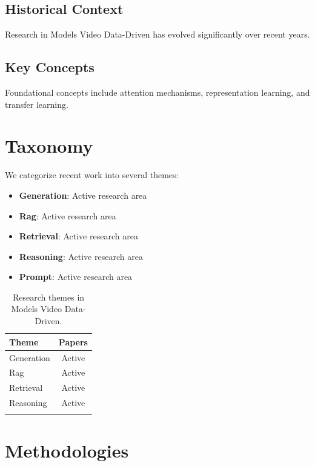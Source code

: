 \documentclass[11pt,a4paper]{article}
\begin{document}
\subsection{Historical Context}

Research in Models Video Data-Driven has evolved significantly over recent years.

\subsection{Key Concepts}

Foundational concepts include attention mechanisms, representation learning, and transfer learning.



\section{Taxonomy}

We categorize recent work into several themes:

\begin{itemize}
    \item \textbf{Generation}: Active research area
    \item \textbf{Rag}: Active research area
    \item \textbf{Retrieval}: Active research area
    \item \textbf{Reasoning}: Active research area
    \item \textbf{Prompt}: Active research area
\end{itemize}

\begin{table}[t]
\centering
\caption{Research themes in Models Video Data-Driven.}
\begin{tabular}{@{}lc@{}}
\toprule
\textbf{Theme} & \textbf{Papers} \\ \midrule
    Generation & Active \\
    Rag & Active \\
    Retrieval & Active \\
    Reasoning & Active \\ \\ \bottomrule
\end{tabular}
\end{table}



\section{Methodologies}
\end{document}
